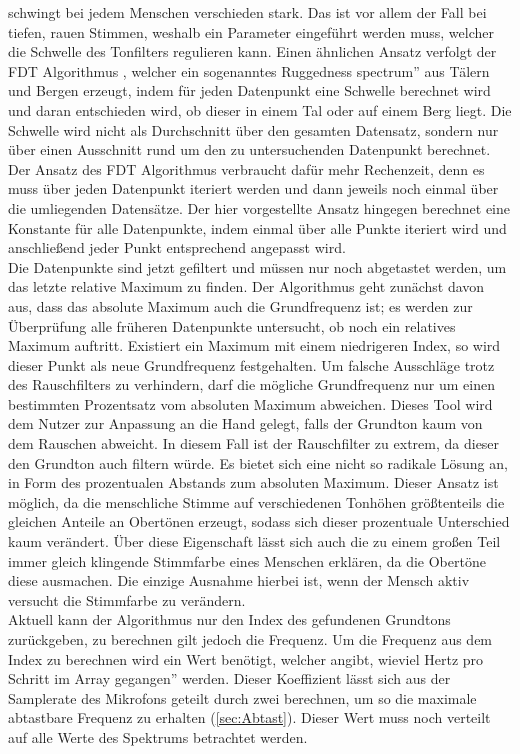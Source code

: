 schwingt bei jedem Menschen verschieden stark. Das ist vor allem der Fall bei tiefen, rauen Stimmen, weshalb ein Parameter 
eingeführt werden muss, welcher die Schwelle des Tonfilters regulieren kann. Einen ähnlichen Ansatz verfolgt der FDT Algorithmus \cite{yazama2005simple}, welcher ein sogenanntes \glqq Ruggedness spectrum'' aus Tälern und Bergen erzeugt, indem für jeden Datenpunkt eine Schwelle berechnet wird und daran entschieden wird, ob dieser in einem Tal oder auf einem Berg liegt. Die Schwelle wird nicht als Durchschnitt über den gesamten Datensatz, sondern nur über einen Ausschnitt rund um den zu untersuchenden Datenpunkt berechnet. Der Ansatz des FDT Algorithmus verbraucht dafür mehr Rechenzeit, denn es muss über jeden Datenpunkt iteriert werden und dann jeweils noch einmal über die umliegenden Datensätze. Der hier vorgestellte Ansatz hingegen berechnet eine Konstante für alle Datenpunkte, indem einmal über alle Punkte iteriert wird und anschließend jeder Punkt entsprechend angepasst wird. \\
Die Datenpunkte sind jetzt gefiltert und müssen nur noch abgetastet werden, um das letzte relative Maximum zu finden. Der Algorithmus geht zunächst davon aus, dass das absolute Maximum auch die Grundfrequenz ist; es werden zur Überprüfung alle früheren Datenpunkte untersucht, ob noch ein relatives Maximum auftritt. Existiert ein Maximum mit einem niedrigeren Index, so wird dieser Punkt als neue Grundfrequenz festgehalten. Um falsche Ausschläge trotz des Rauschfilters zu verhindern, darf die mögliche Grundfrequenz nur um einen bestimmten Prozentsatz vom absoluten Maximum abweichen. Dieses Tool wird dem Nutzer zur Anpassung an die Hand gelegt, falls der Grundton kaum von dem Rauschen abweicht. In diesem Fall ist der Rauschfilter zu extrem, da dieser den Grundton auch filtern würde. Es bietet sich eine nicht so radikale Lösung an, in Form des prozentualen Abstands zum absoluten Maximum. Dieser Ansatz ist möglich, da die menschliche Stimme auf verschiedenen Tonhöhen größtenteils die gleichen Anteile an Obertönen erzeugt, sodass sich dieser prozentuale Unterschied kaum verändert. Über diese Eigenschaft lässt sich auch die zu einem großen Teil immer gleich klingende Stimmfarbe eines Menschen erklären, da die Obertöne diese ausmachen. Die einzige Ausnahme hierbei ist, wenn der Mensch aktiv versucht die Stimmfarbe zu verändern. \\
Aktuell kann der Algorithmus nur den Index des gefundenen Grundtons zurückgeben, zu berechnen gilt jedoch die Frequenz. Um die Frequenz aus dem Index zu berechnen wird ein Wert benötigt, welcher angibt, wieviel Hertz pro Schritt im Array \glqq gegangen'' werden. Dieser Koeffizient lässt sich aus der Samplerate des Mikrofons geteilt durch zwei berechnen, um so die maximale abtastbare Frequenz zu erhalten (\ref{sec:Abtast}). Dieser Wert muss noch verteilt auf alle Werte des Spektrums betrachtet werden.
